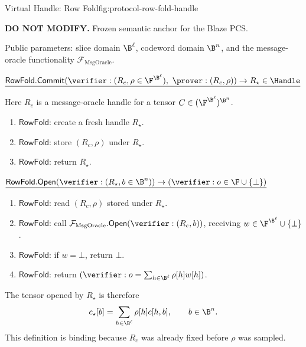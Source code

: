 \begin{protocolbox}{Virtual Handle: Row Fold}{fig:protocol-row-fold-handle}
\scriptsize\raggedright
\noindent\textbf{DO NOT MODIFY.} Frozen semantic anchor for the Blaze PCS.

\smallskip
\noindent Public parameters: slice domain \(\B^\ell\), codeword domain
\(\B^n\), and the message-oracle functionality
\(\mathcal F_{\mathrm{MsgOracle}}\).

\smallskip
\noindent\(\underline{\mathsf{RowFold.Commit}(\verifier:(R_c,\rho\in\F^{\B^\ell}),\ \prover:(R_c,\rho))\to R_\star\in\Handle}\)

\smallskip
\noindent Here \(R_c\) is a message-oracle handle for a tensor
\(C\in(\F^{\B^\ell})^{\B^n}\).

\smallskip
\begin{enumerate}[leftmargin=0.24in,label=\textbf{F\arabic*.},itemsep=0.06em,topsep=0.06em,parsep=0pt]
  \item \(\mathsf{RowFold}\): create a fresh handle \(R_\star\).
  \item \(\mathsf{RowFold}\): store \((R_c,\rho)\) under \(R_\star\).
  \item \(\mathsf{RowFold}\): return \(R_\star\).
\end{enumerate}

\smallskip
\noindent\(\underline{\mathsf{RowFold.Open}(\verifier:(R_\star,b\in\B^n))\to(\verifier:o\in\F\cup\{\bot\})}\)

\smallskip
\begin{enumerate}[leftmargin=0.24in,label=\textbf{G\arabic*.},itemsep=0.06em,topsep=0.06em,parsep=0pt]
  \item \(\mathsf{RowFold}\): read \((R_c,\rho)\) stored under \(R_\star\).
  \item \(\mathsf{RowFold}\): call
        \(\mathcal F_{\mathrm{MsgOracle}}.\mathsf{Open}(\verifier:(R_c,b))\),
        receiving \(w\in\F^{\B^\ell}\cup\{\bot\}\).
  \item \(\mathsf{RowFold}\): if \(w=\bot\), return \(\bot\).
  \item \(\mathsf{RowFold}\): return
        \((\verifier:o=\sum_{h\in\B^\ell}\rho[h]w[h])\).
\end{enumerate}
\end{protocolbox}

The tensor opened by \(R_\star\) is therefore
\[
  c_\star[b]=\sum_{h\in\B^\ell}\rho[h]c[h,b],
  \qquad b\in\B^n.
\]
This definition is binding because \(R_c\) was already fixed before
\(\rho\) was sampled.


